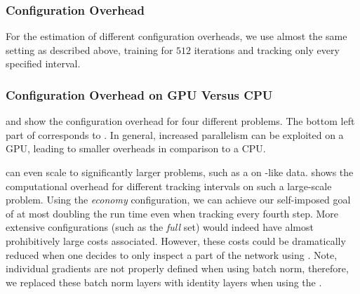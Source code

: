 \subsubsection{Configuration Overhead}\label{cockpit::app:benchmark-configuration}

For the estimation of different \cockpit configuration overheads, we use almost
the same setting as described above, training for $512$ iterations and tracking
only every specified interval.

\subsubsection{Configuration Overhead on GPU Versus CPU}

 and
 show the configuration
overhead for four different \deepobs problems. The bottom left part of
 corresponds to
. In general, increased parallelism can be
exploited on a GPU, leading to smaller overheads in comparison to a CPU.

\cockpit can even scale to significantly larger problems, such as a \resnetfifty
on \imagenet-like data.
 shows the
computational overhead for different tracking intervals on such a large-scale
problem. Using the \textit{economy} configuration, we can achieve our
self-imposed goal of at most doubling the run time even when tracking every
fourth step. More extensive configurations (such as the \textit{full} set) would
indeed have almost prohibitively large costs associated. However, these costs
could be dramatically reduced when one decides to only inspect a part of the
network using \cockpit. Note, individual gradients are not properly defined when
using batch norm, therefore, we replaced these batch norm layers with identity
layers when using the \resnetfifty.





\clearpage



